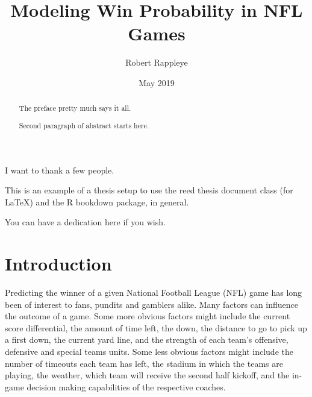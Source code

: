\documentclass[12pt,twoside]{dukestatscithesis}
\title{Modeling Win Probability in NFL Games}
\author{Robert Rappleye}
\date{May 2019}
\begin{document}
  \maketitle

\frontmatter %
\pagestyle{empty} %
  \begin{acknowledgements}
    I want to thank a few people.
  \end{acknowledgements}
  \begin{preface}
    This is an example of a thesis setup to use the reed thesis document class
    (for LaTeX) and the R bookdown package, in general.
  \end{preface}
  \hypersetup{linkcolor=black}
  \setcounter{tocdepth}{2}
  \tableofcontents

  \listoftables

  \listoffigures
  \begin{abstract}
    The preface pretty much says it all.
    
    \par
    
    Second paragraph of abstract starts here.
  \end{abstract}
  \begin{dedication}
    You can have a dedication here if you wish.
  \end{dedication}
\mainmatter %
\pagestyle{fancyplain} %

\hypertarget{introduction}{%
\chapter*{Introduction}\label{introduction}}

Predicting the winner of a given National Football League (NFL) game has long been of interest to fans, pundits and gamblers alike. Many factors can influence the outcome of a game. Some more obvious factors might include the current score differential, the amount of time left, the down, the distance to go to pick up a first down, the current yard line, and the strength of each team's offensive, defensive and special teams units. Some less obvious factors might include the number of timeouts each team has left, the stadium in which the teams are playing, the weather, which team will receive the second half kickoff, and the in-game decision making capabilities of the respective coaches.
\end{document}
